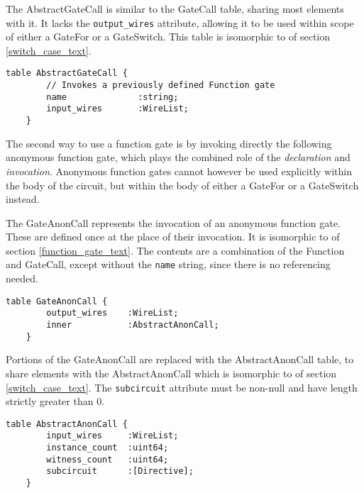 The \textsf{AbstractGateCall} is similar to the \textsf{GateCall} table, sharing most elements with it. It lacks the \texttt{output\_wires} attribute, allowing it to be used within scope of either a \textsf{GateFor} or a \textsf{GateSwitch}. This table is isomorphic to  of section \ref{switch_case_text}.

\begin{lstlisting}[style=fbslisting]
    table AbstractGateCall {
        // Invokes a previously defined Function gate
        name              :string;
        input_wires       :WireList;
    }
\end{lstlisting}

The second way to use a function gate is by invoking directly the following anonymous function gate, which plays the combined role of the \emph{declaration} and \emph{invocation}. Anonymous function gates cannot however be used explicitly within the body of the circuit, but within the body of either a \textsf{GateFor} or a \textsf{GateSwitch} instead.

The \textsf{GateAnonCall} represents the invocation of an anonymous function gate. These are defined once at the place of their invocation. It is isomorphic to  of section \ref{function_gate_text}. The contents are a combination of the \textsf{Function} and \textsf{GateCall}, except without the \texttt{name} string, since there is no referencing needed.

\begin{lstlisting}[style=fbslisting]
    table GateAnonCall {
        output_wires    :WireList;
        inner           :AbstractAnonCall;
    }
\end{lstlisting}

Portions of the \textsf{GateAnonCall} are replaced with the \textsf{AbstractAnonCall} table, to share elements with the \textsf{AbstractAnonCall} which is isomorphic to  of section \ref{switch_case_text}.
The \texttt{subcircuit} attribute must be non-null and have length strictly greater than 0.

\begin{lstlisting}[style=fbslisting]
    table AbstractAnonCall {
        input_wires     :WireList;
        instance_count  :uint64;
        witness_count   :uint64;
        subcircuit      :[Directive];
    }
\end{lstlisting}

